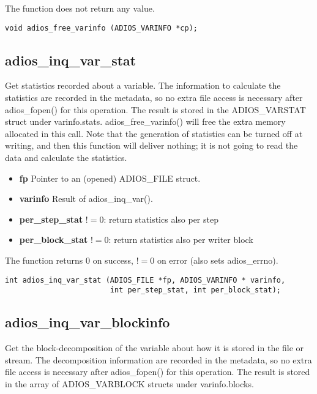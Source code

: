 \noindent The function does not return any value.

\begin{lstlisting}[alsolanguage=C]
void adios_free_varinfo (ADIOS_VARINFO *cp);
\end{lstlisting}

\subsection{adios\_inq\_var\_stat}
Get statistics recorded about a variable. The information to calculate the statistics are recorded in the metadata,
so no extra file access is necessary after adios\_fopen() for this operation.
The result is stored in the ADIOS\_VARSTAT struct under varinfo.stats. 
adios\_free\_varinfo() will free the extra memory allocated in this call. 
Note that the generation of statistics can be turned off at writing, and then this function will deliver 
nothing; it is not going to read the data and calculate the statistics. 

\begin{itemize}
\item{\bf fp}  Pointer to an (opened) ADIOS\_FILE struct.
\item{\bf  varinfo}        Result of adios\_inq\_var(). 
\item{\bf per\_step\_stat}  $!=0$: return statistics also per step
\item{\bf per\_block\_stat} $!=0$: return statistics also per writer block 
\end{itemize}

\noindent The function returns 0 on success, $!=0$ on error (also sets adios\_errno). 

\begin{lstlisting}[alsolanguage=C]
int adios_inq_var_stat (ADIOS_FILE *fp, ADIOS_VARINFO * varinfo,
                        int per_step_stat, int per_block_stat);
\end{lstlisting}

\subsection{adios\_inq\_var\_blockinfo}
Get the block-decomposition of the variable about how it is stored in 
the file or stream. The decomposition information are recorded in the
metadata, so no extra file access is necessary after adios\_fopen() for 
this operation. The result is stored in the array of 
ADIOS\_VARBLOCK structs under varinfo.blocks. 

